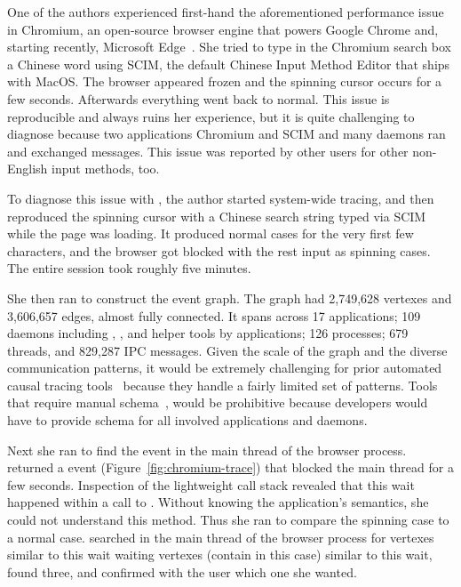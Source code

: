 One of the authors experienced first-hand the aforementioned performance issue
in Chromium, an open-source browser engine that powers Google Chrome and,
starting recently, Microsoft Edge~\cite{chromiumurl}.  She tried to type in the
Chromium search box a Chinese word using SCIM, the default Chinese Input Method
Editor that ships with MacOS.  The browser appeared frozen and the spinning
cursor occurs for a few seconds.  Afterwards everything went back to normal.
This issue is reproducible and always ruins her experience, but it is quite
challenging to diagnose because two applications Chromium and SCIM and many
daemons ran and exchanged messages.  This issue was reported by other users for
other non-English input methods, too.

To diagnose this issue with \xxx, the author started system-wide tracing, and
then reproduced the spinning cursor with a Chinese search string typed via SCIM
while the page was loading. It produced normal cases for the very first few
characters, and the browser got blocked with the rest input as spinning cases.
The entire session took roughly five minutes.

She then ran \xxx to construct the event graph.  The graph had 2,749,628
vertexes and 3,606,657 edges, almost fully connected.  It spans across 17
applications; 109 daemons including , , 
and helper tools by applications; 126 processes; 679 threads, and 829,287 IPC
messages.  Given the scale of the graph and the diverse communication patterns,
it would be extremely challenging for prior automated causal tracing
tools~\cite{aguilera2003performance, zhang2013panappticon, attariyan2012x,
cohen2004correlating} because they handle a fairly limited set of patterns.
Tools that require manual schema~\cite{barham2004using, reynolds2006pip}, would
be prohibitive because developers would have to provide schema for all involved
applications and daemons.


Next she ran \xxx to find the event in the main thread of the browser process.
\xxx returned a  event (Figure~\ref{fig:chromium-trace})
that blocked the main thread for a few seconds.  Inspection of the lightweight
call stack revealed that this wait happened within a call to
.  Without knowing the
application's semantics, she could not understand this method.  Thus she ran
\xxx to compare the spinning case to a normal case.  \xxx searched in the main
thread of the browser process for vertexes similar to this wait waiting
vertexes (contain  in this case) similar to
this wait, found three, and confirmed with the user which one she wanted.

